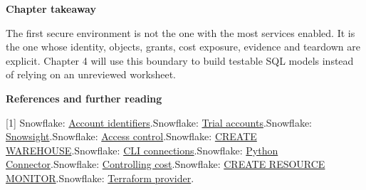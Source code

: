 \documentclass[11pt,twoside]{article}
\begin{document}
\begin{insight}
\textbf{Chapter takeaway}\par
The first secure environment is not the one with the most services enabled. It is the one whose identity, objects, grants, cost exposure, evidence and teardown are explicit. Chapter 4 will use this boundary to build testable SQL models instead of relying on an unreviewed worksheet.
\end{insight}
{\sffamily\bfseries\fontsize{9}{11}\selectfont References and further reading}\par
{\fontsize{8.1}{9.5}\selectfont\color{inkgray}
[1] Snowflake: \href{https://docs.snowflake.com/en/user-guide/admin-account-identifier}{Account identifiers}.\quad [2] Snowflake: \href{https://docs.snowflake.com/en/user-guide/admin-trial-account}{Trial accounts}.\quad [3] Snowflake: \href{https://docs.snowflake.com/en/user-guide/ui-snowsight}{Snowsight}.\quad [4] Snowflake: \href{https://docs.snowflake.com/en/user-guide/security-access-control-overview}{Access control}.\quad [5] Snowflake: \href{https://docs.snowflake.com/en/sql-reference/sql/create-warehouse}{CREATE WAREHOUSE}.\quad [6] Snowflake: \href{https://docs.snowflake.com/en/developer-guide/snowflake-cli/connecting/configure-connections}{CLI connections}.\quad [7] Snowflake: \href{https://docs.snowflake.com/en/developer-guide/python-connector/python-connector-connect}{Python Connector}.\quad [8] Snowflake: \href{https://docs.snowflake.com/en/user-guide/cost-controlling}{Controlling cost}.\quad [9] Snowflake: \href{https://docs.snowflake.com/en/sql-reference/sql/create-resource-monitor}{CREATE RESOURCE MONITOR}.\quad [10] Snowflake: \href{https://github.com/snowflakedb/terraform-provider-snowflake}{Terraform provider}.\quad \par}
\end{document}
